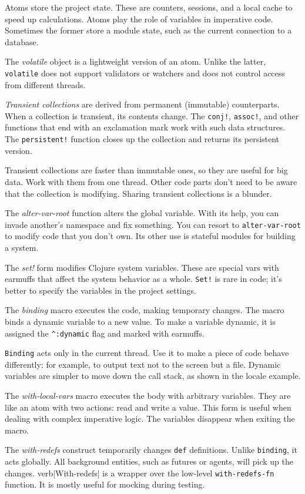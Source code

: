 Atoms store the project state.
These are counters, sessions, and a local cache to speed up calculations.
Atoms play the role of variables in imperative code. Sometimes the former store a module state, such as the current connection to a database.

The \emph{volatile} object is a lightweight version of an atom.
Unlike the latter, \verb|volatile| does not support validators or watchers and does not control access from different threads.

\emph{Transient collections} are derived from permanent (immutable) counterparts.
When a collection is transient, its contents change.
The \verb|conj!|, \verb|assoc!|, and other functions that end with an exclamation mark work with such data structures.
The \verb|persistent!| function closes up the collection and returns its persistent version.

Transient collections are faster than immutable ones, so they are useful for big data.
Work with them from one thread.
Other code parts don't need to be aware that the collection is modifying.
Sharing transient collections is a blunder.

The \emph{alter-var-root} function alters the global variable.
With its help, you can invade another's namespace and fix something.
You can resort to \verb|alter-var-root| to modify code that you don't own.
Its other use is stateful modules for building a system.

The \emph{set!} form modifies Clojure system variables.
These are special vars with earmuffs that affect the system behavior as a whole.
\verb|Set!| is rare in code; it's better to specify the variables in the project settings.

The \emph{binding} macro executes the code, making temporary changes.
The macro binds a dynamic variable to a new value.
To make a variable dynamic, it is assigned the \verb|^:dynamic| flag and marked with earmuffs.

\verb|Binding| acts only in the current thread.
Use it to make a piece of code behave differently: for example, to output text not to the screen but a file.
Dynamic variables are simpler to move down the call stack, as shown in the locale example.

The \emph{with-local-vars} macro executes the body with arbitrary variables.
They are like an atom with two actions: read and write a value.
This form is useful when dealing with complex imperative logic.
The variables disappear when exiting the macro.

The \emph{with-redefs} construct temporarily changes \verb|def| definitions.
Unlike \verb|binding|, it acts globally.
All background entities, such as futures or agents, will pick up the changes.
verb|With-redefs| is a wrapper over the low-level \verb|with-redefs-fn| function.
It is mostly useful for mocking during testing.
